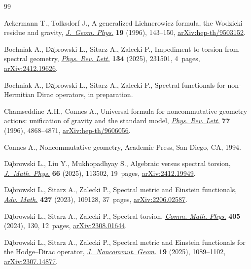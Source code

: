 \documentclass[pdftex]{sigma}
\numberwithin{equation}{section}
\theoremstyle{definition}
\begin{document}
\begin{thebibliography}{99}
\footnotesize\itemsep=0pt

Ackermann T., Tolksdorf J., A generalized {L}ichnerowicz formula, the
 {W}odzicki residue and gravity,
 \href{https://doi.org/10.1016/0393-0440(95)00030-5}{\textit{J.~Geom. Phys.}}
 \textbf{19} (1996), 143--150,
 \href{http://arxiv.org/abs/hep-th/9503152}{arXiv:hep-th/9503152}.

Bochniak A., D\c{a}browski L., Sitarz A., Zalecki P., Impediment to torsion
 from spectral geometry,
 \href{https://doi.org/10.1103/drdl-l2mp}{\textit{Phys. Rev. Lett.}}
 \textbf{134} (2025), 231501, 4~pages,
 \href{http://arxiv.org/abs/2412.19626}{arXiv:2412.19626}.

Bochniak A., D\c{a}browski L., Sitarz A., Zalecki P., Spectral functionals for
 non-{H}ermitian {D}irac operators, {i}n preparation.

Chamseddine A.H., Connes A., Universal formula for noncommutative geometry
 actions: unification of gravity and the standard model,
 \href{https://doi.org/10.1103/PhysRevLett.77.4868}{\textit{Phys. Rev. Lett.}}
 \textbf{77} (1996), 4868--4871,
 \href{http://arxiv.org/abs/hep-th/9606056}{arXiv:hep-th/9606056}.

Connes A., Noncommutative geometry, Academic Press, San Diego, CA, 1994.

D\c{a}browski L., Liu Y., Mukhopadhyay S., Algebraic versus spectral torsion,
 \href{https://doi.org/10.1063/5.0281331}{\textit{J.~Math. Phys.}} \textbf{66}
 (2025), 113502, 19~pages,
 \href{http://arxiv.org/abs/2412.19949}{arXiv:2412.19949}.

D\c{a}browski L., Sitarz A., Zalecki P., Spectral metric and {E}instein
 functionals, \href{https://doi.org/10.1016/j.aim.2023.109128}{\textit{Adv.
 Math.}} \textbf{427} (2023), 109128, 37~pages,
 \href{http://arxiv.org/abs/2206.02587}{arXiv:2206.02587}.

D\c{a}browski L., Sitarz A., Zalecki P., Spectral torsion,
 \href{https://doi.org/10.1007/s00220-024-04950-7}{\textit{Comm. Math. Phys.}}
 \textbf{405} (2024), 130, 12~pages,
 \href{http://arxiv.org/abs/2308.01644}{arXiv:2308.01644}.

D\c{a}browski L., Sitarz A., Zalecki P., Spectral metric and {E}instein
 functionals for the {H}odge--{D}irac operator,
 \href{https://doi.org/10.4171/jncg/573}{\textit{J.~Noncommut. Geom.}}
 \textbf{19} (2025), 1089--1102,
 \href{http://arxiv.org/abs/2307.14877}{arXiv:2307.14877}.


\end{thebibliography}
\end{document}
